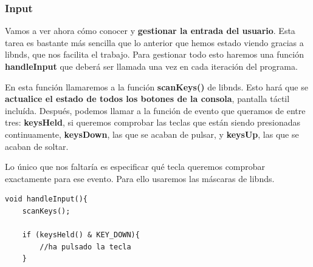 \subsubsection{Input}

Vamos a ver ahora cómo conocer y \textbf{gestionar la entrada del usuario}. Esta tarea es bastante más sencilla que lo anterior que hemos estado viendo gracias a libnds, que nos facilita el trabajo. Para gestionar todo esto haremos una función \textbf{handleInput} que deberá ser llamada una vez en cada iteración del programa.

\vspace{0.5cm}

En esta función llamaremos a la función \textbf{scanKeys()} de libnds. Esto hará que se \textbf{actualice el estado de todos los botones de la consola}, pantalla táctil incluída. Después, podemos llamar a la función de evento que queramos de entre tres: \textbf{keysHeld}, si queremos comprobar las teclas que están siendo presionadas continuamente, \textbf{keysDown}, las que se acaban de pulsar, y \textbf{keysUp}, las que se acaban de soltar.

\vspace{0.5cm}

Lo único que nos faltaría es especificar qué tecla queremos comprobar exactamente para ese evento. Para ello usaremos las máscaras de libnds.

\begin{lstlisting}[caption={Función para comprobar si el jugado mantiene pulsado el pad de direcciónes hacia abajo}, label={code:gameinput}]
void handleInput(){
	scanKeys();

	if (keysHeld() & KEY_DOWN){
        //ha pulsado la tecla
	}
\end{lstlisting}

\vspace{0.5cm}

